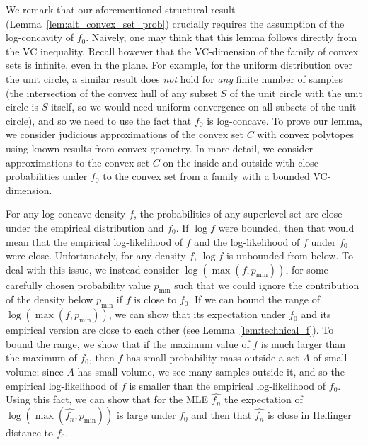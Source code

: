 \documentclass[final,12pt]{colt2018}
\newtheorem{informal theorem}[theorem]{Theorem (informal statement)}
\begin{document}
We remark that our aforementioned structural result (Lemma~\ref{lem:alt_convex_set_prob})
crucially requires the assumption of the log-concavity of $f_0$. Naively, one may think that 
this lemma follows directly from the VC inequality. 
Recall however that the VC-dimension of the family of convex sets is infinite, even in the plane.
For example, for the uniform distribution over the unit circle, 
a similar result does {\em not} hold for {\em any} finite number of samples (the intersection of the convex hull of any subset $S$ of the unit circle with the unit circle is $S$ itself, so we would need uniform convergence on all subsets of the unit circle), 
and so we need to use the fact that $f_0$ is log-concave.
To prove our lemma, we consider judicious approximations of 
the convex set $C$ with convex polytopes using known results from convex geometry. 
In more detail, we consider approximations to the convex set $C$ on the inside and outside 
with close probabilities under $f_0$ to the convex set from a family with a bounded VC-dimension.

For any log-concave density $f$, the probabilities of any superlevel 
set are close under the empirical distribution and $f_0$. If 
$\log f$ were bounded, then that would mean that the empirical log-likelihood of $f$
and the log-likelihood of $f$ under $f_0$ were close. Unfortunately, for any density $f$, 
$\log f$ is unbounded from below. 
To deal with this issue, we instead consider $\log(\max(f, p_{\min}))$, 
for some carefully chosen probability value $p_{\min}$ such that 
we could ignore the contribution of the density below 
$p_{\min}$ if $f$ is close to $f_0$. If we can bound the range of $\log(\max(f, p_{\min}))$, 
we can show that its expectation under $f_0$ and its empirical version 
are close to each other (see Lemma~\ref{lem:technical_f}).
To bound the range, we show that if the maximum value of $f$ is much larger than the maximum of $f_0$, 
then $f$ has small probability mass outside a set $A$ of small volume; since $A$ has small volume, 
we see many samples outside it, and so the empirical log-likelihood of $f$ is smaller than 
the empirical log-likelihood of $f_0$. Using this fact, we can show that for the MLE 
$\hat{f_n}$ the expectation of $\log(\max( \hat{f_n}, p_{\min}))$ 
is large under $f_0$ and then that $\hat{f_n}$ is close in Hellinger distance to $f_0$.
\end{document}

